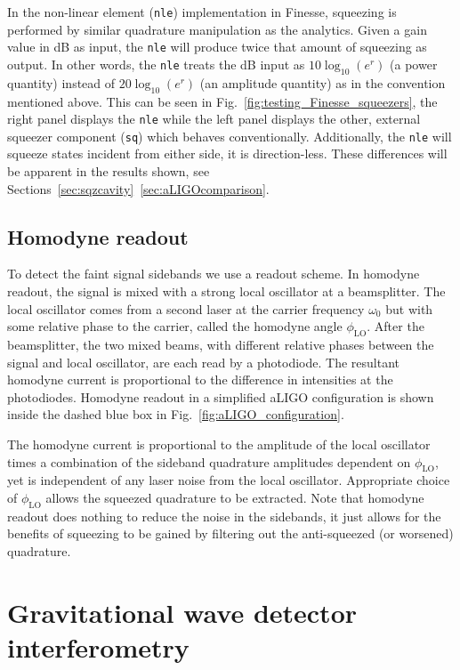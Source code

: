 \documentclass[aps,pra,superscriptaddress,reprint,nofootinbib]{revtex4-1}
\newcommand{\code}[1]{\texttt{#1}}
\begin{document}
In the non-linear element (\code{nle}) implementation in Finesse, squeezing is performed by similar quadrature manipulation as the analytics. Given a gain value in dB as input, the \code{nle} will produce twice that amount of squeezing as output. In other words, the \code{nle} treats the dB input as $10 \log_{10} (e^r)$ (a power quantity) instead of $20 \log_{10} (e^r)$ (an amplitude quantity) as in the convention mentioned above. This can be seen in Fig.~\ref{fig:testing_Finesse_squeezers}, the right panel displays the \code{nle} while the left panel displays the other, external squeezer component (\code{sq}) which behaves conventionally. Additionally, the \code{nle} will squeeze states incident from either side, it is direction-less. These differences will be apparent in the results shown, see Sections~\ref{sec:sqzcavity}~\ref{sec:aLIGOcomparison}.


\subsection{Homodyne readout}

To detect the faint signal sidebands we use a readout scheme. In homodyne readout, the signal is mixed with a strong local oscillator at a beamsplitter. The local oscillator comes from a second laser at the carrier frequency $\omega_0$ but with some relative phase to the carrier, called the homodyne angle $\phi_{\mathrm{LO}}$. After the beamsplitter, the two mixed beams, with different relative phases between the signal and local oscillator, are each read by a photodiode.
The resultant homodyne current is proportional to the difference in intensities at the photodiodes.
Homodyne readout in a simplified aLIGO configuration is shown inside the dashed blue box in Fig.~\ref{fig:aLIGO_configuration}.


The homodyne current is proportional to the amplitude of the local oscillator times a combination of the sideband quadrature amplitudes dependent on $\phi_{\mathrm{LO}}$, yet is independent of any laser noise from the local oscillator. Appropriate choice of $\phi_{\mathrm{LO}}$ allows the squeezed quadrature to be extracted. Note that homodyne readout does nothing to reduce the noise in the sidebands, it just allows for the benefits of squeezing to be gained by filtering out the anti-squeezed (or worsened) quadrature.


\section{Gravitational wave detector interferometry}
\label{sec:gwIFO}
\end{document}
